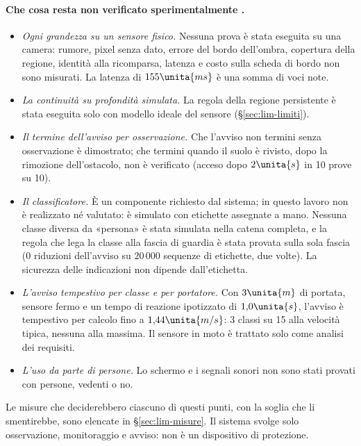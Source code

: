 \paragraph{Che cosa resta non verificato sperimentalmente .}
\begin{itemize}
\item \emph{Ogni grandezza su un sensore fisico.} Nessuna prova è stata eseguita su una camera: rumore, pixel senza dato, errore del bordo dell'ombra, copertura della regione, identità alla ricomparsa, latenza e costo sulla scheda di bordo non sono misurati. La latenza di $155\unita{ms}$ è una somma di voci note.
\item \emph{La continuità su profondità simulata.} La regola della regione persistente è stata eseguita solo con modello ideale del sensore (\S\ref{sec:lim-limiti}).
\item \emph{Il termine dell'avviso per osservazione.} Che l'avviso non termini senza osservazione è dimostrato; che termini quando il suolo è rivisto, dopo la rimozione dell'ostacolo, non è verificato (acceso dopo $2\unita{s}$ in 10 prove su 10).
\item \emph{Il classificatore.} È un componente richiesto dal sistema; in questo lavoro non è realizzato né valutato: è simulato con etichette assegnate a mano. Nessuna classe diversa da «persona» è stata simulata nella catena completa, e la regola che lega la classe alla fascia di guardia è stata provata sulla sola fascia (0 riduzioni dell'avviso su $20\,000$ sequenze di etichette, due volte). La sicurezza delle indicazioni non dipende dall'etichetta.
\item \emph{L'avviso tempestivo per classe e per portatore.} Con $3\unita{m}$ di portata, sensore fermo e un tempo di reazione ipotizzato di $1{,}0\unita{s}$, l'avviso è tempestivo per calcolo fino a $1{,}44\unita{m/s}$: 3 classi su 15 alla velocità tipica, nessuna alla massima. Il sensore in moto è trattato solo come analisi dei requisiti.
\item \emph{L'uso da parte di persone.} Lo schermo e i segnali sonori non sono stati provati con persone, vedenti o no.
\end{itemize}

Le misure che deciderebbero ciascuno di questi punti, con la soglia che li smentirebbe, sono elencate in \S\ref{sec:lim-misure}. Il sistema svolge solo osservazione, monitoraggio e avviso: non è un dispositivo di protezione.
